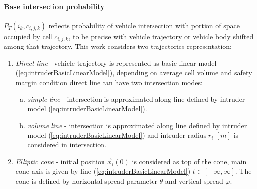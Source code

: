 \paragraph{Base intersection probability} $P_T(i_k,c_{i,j,k})$ reflects probability of vehicle intersection with portion of space occupied by cell $c_{i,j,k}$, to be precise with vehicle trajectory or vehicle body shifted among that trajectory. This work considers two trajectories representation:
\begin{enumerate}
    \item \textit{Direct line} - vehicle trajectory is represented as basic linear model (\ref{eq:intruderBasicLinearModel}), depending on average cell volume and safety margin condition direct line can have two intersection modes:
    \begin{enumerate}[a.]
        \item \textit{simple line} - intersection is approximated along line defined by intruder model (\ref{eq:intruderBasicLinearModel}).
        \item \textit{volume line} - intersection is approximated along line defined by intruder model (\ref{eq:intruderBasicLinearModel}) and intruder radius $r_i$ $[m]$ is considered in intersection.
    \end{enumerate}
    \item \textit{Elliptic cone} - initial position $\vec{x}_i(0)$ is considered as top of the cone, main cone axis is given by line (\ref{eq:intruderBasicLinearModel}) $t\in [-\infty,\infty]$. The cone is defined by horizontal spread parameter $\theta$ and vertical spread $\varphi$.
\end{enumerate}

